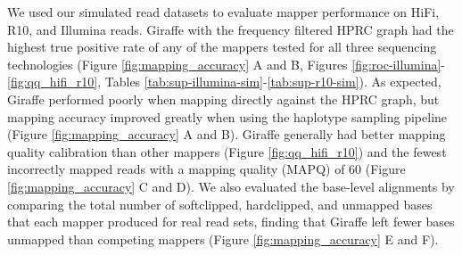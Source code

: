 \documentclass[11pt]{ucscthesis}
\begin{document}
We used our simulated read datasets to evaluate mapper performance on HiFi, R10, and Illumina reads.
Giraffe with the frequency filtered HPRC graph had the highest true positive rate of any of the mappers tested for all three sequencing technologies (Figure \ref{fig:mapping_accuracy} A and B, Figures \ref{fig:roc-illumina}-\ref{fig:qq_hifi_r10}, Tables \ref{tab:sup-illumina-sim}-\ref{tab:sup-r10-sim}).
As expected, Giraffe performed poorly when mapping directly against the HPRC graph, but mapping accuracy improved greatly when using the haplotype sampling pipeline (Figure \ref{fig:mapping_accuracy} A and B).
Giraffe generally had better mapping quality calibration than other mappers (Figure \ref{fig:qq_hifi_r10}) and the fewest incorrectly mapped reads with a mapping quality (MAPQ) of 60 (Figure \ref{fig:mapping_accuracy} C and D).
We also evaluated the base-level alignments by comparing the total number of softclipped, hardclipped, and unmapped bases that each mapper produced for real read sets, finding that Giraffe left fewer bases unmapped than competing mappers (Figure \ref{fig:mapping_accuracy} E and F).
\end{document}
